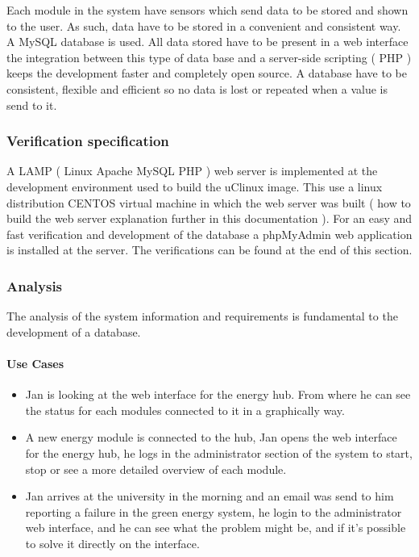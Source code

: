 Each module in the system have sensors which send data to be stored and shown to the user. As such, data have to be stored in a convenient and consistent way. A MySQL database is used. All data stored have to be present in a web interface the integration between this type of data base and a server-side scripting ( PHP ) keeps the development faster and completely open source.
A database have to be consistent, flexible and efficient so no data is lost or repeated when a value is send to it.
%
\subsubsection{Verification specification}
A LAMP ( Linux Apache MySQL PHP ) web server is implemented at the development environment used to build the uClinux image. This use a linux distribution CENTOS virtual machine in which the web server was built ( how to build the web server explanation further in this documentation ).
For an easy and fast verification and development of the database a phpMyAdmin web application is installed at the server.
The verifications can be found at the end of this section.

%	
\subsubsection{Analysis}
The analysis of the system information and requirements is fundamental to the development of a database. 
\paragraph{Use Cases}
	\begin{itemize}
		\item Jan is looking at the web interface for the energy hub. From where he can see the status for each modules connected to it
in a graphically way.
		\item A new energy module is connected to the hub, Jan opens the web interface for the energy hub, he logs in the administrator section of the system
to start, stop or see a more detailed overview of each module.
		\item Jan arrives at the university in the morning and an email was send to him reporting a failure in the green energy system, he login to the administrator web interface, and he can see what the problem might be, and if it's possible to solve it directly on the interface.
	\end{itemize}

